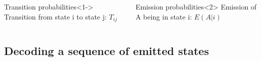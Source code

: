 \documentclass{beamer}[12pt]
\begin{document}
\begin{frame}
\begin{columns}
		\begin{block}{Transition probabilities}<1->
			Transition from state i to state j: $T_{ij}$\\
		
		\end{block}
		\vspace{0.3cm}
		\begin{block}{Emission probabilities}<2>
			Emission of A being in state i: $E(A|i)$
		\end{block}
\end{columns}
\end{frame}

\subsection{Decoding a sequence of emitted states}
\end{document}
